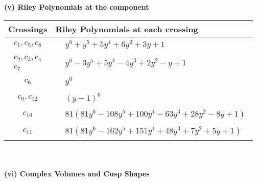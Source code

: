 \documentclass[1p]{elsarticle_modified}
\theoremstyle{definition}
\begin{document}
\newpage\renewcommand{\arraystretch}{1}
\flushleft \textbf{(v) Riley Polynomials at the component}\newline \\
\begin{tabular}{m{50pt}|m{274pt}}
Crossings & \hspace{64pt}Riley Polynomials at each crossing \\
\hline $$\begin{aligned}c_{1},c_{5},c_{8}\end{aligned}$$&$\begin{aligned}
&y^6+y^5+5 y^4+6 y^2+3 y+1
\end{aligned}$\\
\hline $$\begin{aligned}c_{2},c_{3},c_{4}\\c_{7}\end{aligned}$$&$\begin{aligned}
&y^6-3 y^5+5 y^4-4 y^3+2 y^2- y+1
\end{aligned}$\\
\hline $$\begin{aligned}c_{6}\end{aligned}$$&$\begin{aligned}
&y^6
\end{aligned}$\\
\hline $$\begin{aligned}c_{9},c_{12}\end{aligned}$$&$\begin{aligned}
&(y-1)^6
\end{aligned}$\\
\hline $$\begin{aligned}c_{10}\end{aligned}$$&$\begin{aligned}
&81(81 y^6-108 y^5+100 y^4-63 y^3+28 y^2-8 y+1)
\end{aligned}$\\
\hline $$\begin{aligned}c_{11}\end{aligned}$$&$\begin{aligned}
&81(81 y^6-162 y^5+151 y^4+48 y^3+7 y^2+5 y+1)
\end{aligned}$\\
\hline
\end{tabular}\\~\\
\newpage\flushleft \textbf{(vi) Complex Volumes and Cusp Shapes}
\end{document}
